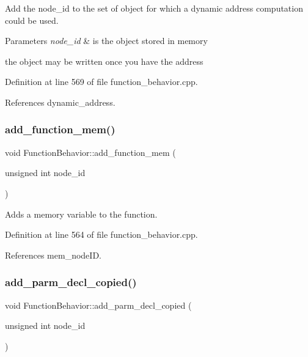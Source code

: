 Add the node\+\_\+id to the set of object for which a dynamic address computation could be used. 


\begin{DoxyParams}{Parameters}
{\em node\+\_\+id} & is the object stored in memory \\
\hline
\end{DoxyParams}
the object may be written once you have the address 

Definition at line 569 of file function\+\_\+behavior.\+cpp.



References dynamic\+\_\+address.

\mbox{\label{classFunctionBehavior_a146cf313c71db7291e2a436498fe675e}} 
\subsubsection{\texorpdfstring{add\+\_\+function\+\_\+mem()}{add\_function\_mem()}}
{\footnotesize\ttfamily void Function\+Behavior\+::add\+\_\+function\+\_\+mem (\begin{DoxyParamCaption}\item[{unsigned int}]{node\+\_\+id }\end{DoxyParamCaption})}



Adds a memory variable to the function. 



Definition at line 564 of file function\+\_\+behavior.\+cpp.



References mem\+\_\+node\+ID.

\mbox{\label{classFunctionBehavior_a96cee8a4ca46fe58894c405c4fe2cf83}} 
\subsubsection{\texorpdfstring{add\+\_\+parm\+\_\+decl\+\_\+copied()}{add\_parm\_decl\_copied()}}
{\footnotesize\ttfamily void Function\+Behavior\+::add\+\_\+parm\+\_\+decl\+\_\+copied (\begin{DoxyParamCaption}\item[{unsigned int}]{node\+\_\+id }\end{DoxyParamCaption})}



